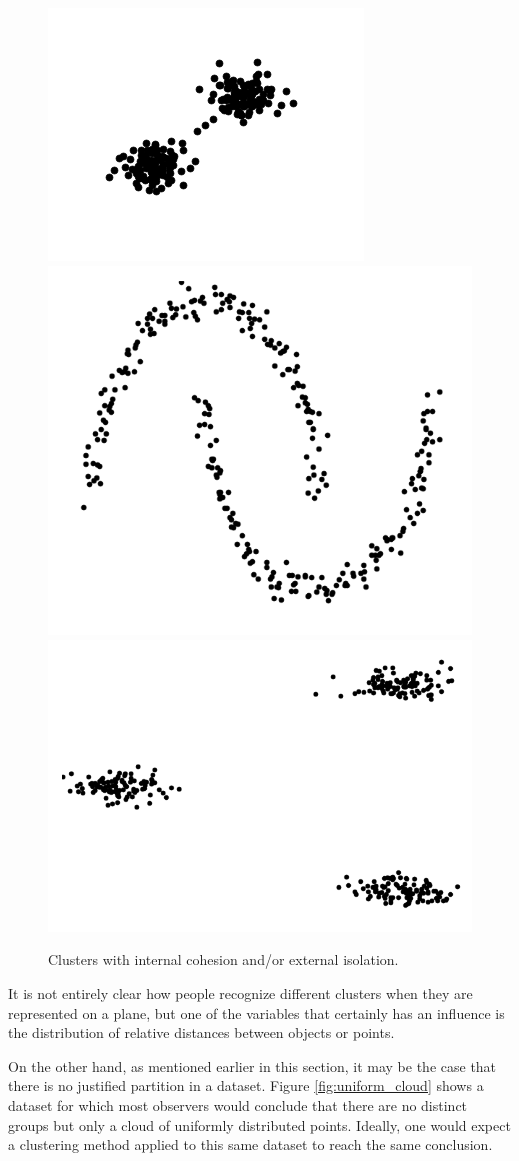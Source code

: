 \begin{figure}[bth]
	\myfloatalign
	{\includegraphics[width=.3\linewidth]{gfx/Clustering/TwoBasicsClusters}}
	{\includegraphics[width=.3\linewidth]{gfx/Clustering/MoonsBasics}}
	{\includegraphics[width=.3\linewidth]{gfx/Clustering/ThreeBasicClusters}}
	\caption{Clusters with internal cohesion and/or external isolation.}\label{fig:ClustersProperties}
\end{figure}

It is not entirely clear how people recognize different clusters when they are represented on a plane, but one of the variables that certainly has an influence is the distribution of relative distances between objects or points.

On the other hand, as mentioned earlier in this section, it may be the case that there is no justified partition in a dataset. Figure \ref{fig:uniform_cloud} shows a dataset for which most observers would conclude that there are no distinct groups but only a cloud of uniformly distributed points. Ideally, one would expect a clustering method applied to this same dataset to reach the same conclusion.

